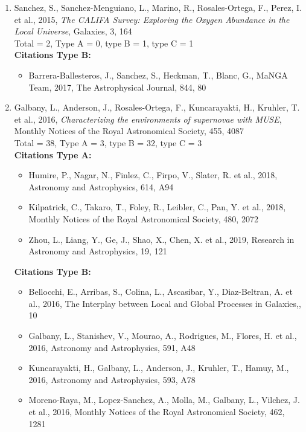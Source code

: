 \documentclass{letter}
\begin{document}
\begin{enumerate}
\begin{itemize}
\end{itemize}
\item Sanchez, S., Sanchez-Menguiano, L., Marino, R., Rosales-Ortega, F., Perez, I. et al., 2015, {\it The CALIFA Survey: Exploring the Oxygen Abundance in the Local Universe}, Galaxies, 3, 164 \\ 
Total = 2, Type A = 0, type B = 1, type C = 1 \\ 
{\bf Citations Type B:}
\begin{itemize}
\item Barrera-Ballesteros, J., Sanchez, S., Heckman, T., Blanc, G., MaNGA Team, 2017, The Astrophysical Journal, 844, 80
\end{itemize}
\item Galbany, L., Anderson, J., Rosales-Ortega, F., Kuncarayakti, H., Kruhler, T. et al., 2016, {\it Characterizing the environments of supernovae with MUSE}, Monthly Notices of the Royal Astronomical Society, 455, 4087 \\ 
Total = 38, Type A = 3, type B = 32, type C = 3 \\ 
{\bf Citations Type A:}
\begin{itemize}
\item Humire, P., Nagar, N., Finlez, C., Firpo, V., Slater, R. et al., 2018, Astronomy and Astrophysics, 614, A94
\item Kilpatrick, C., Takaro, T., Foley, R., Leibler, C., Pan, Y. et al., 2018, Monthly Notices of the Royal Astronomical Society, 480, 2072
\item Zhou, L., Liang, Y., Ge, J., Shao, X., Chen, X. et al., 2019, Research in Astronomy and Astrophysics, 19, 121
\end{itemize}
{\bf Citations Type B:}
\begin{itemize}
\item Bellocchi, E., Arribas, S., Colina, L., Ascasibar, Y., Diaz-Beltran, A. et al., 2016, The Interplay between Local and Global Processes in Galaxies,, 10
\item Galbany, L., Stanishev, V., Mourao, A., Rodrigues, M., Flores, H. et al., 2016, Astronomy and Astrophysics, 591, A48
\item Kuncarayakti, H., Galbany, L., Anderson, J., Kruhler, T., Hamuy, M., 2016, Astronomy and Astrophysics, 593, A78
\item Moreno-Raya, M., Lopez-Sanchez, A., Molla, M., Galbany, L., Vilchez, J. et al., 2016, Monthly Notices of the Royal Astronomical Society, 462, 1281

\end{itemize}
\end{enumerate}
\end{document}

